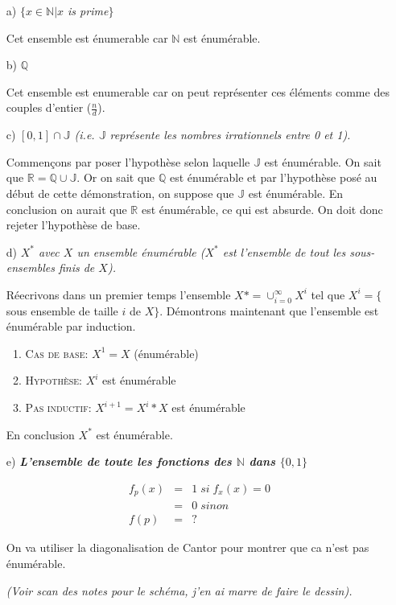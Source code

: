 \begin{itemize}
\item[a)]\textit{$\{x \in \mathbb{N}|x$ is prime$\}$}

Cet ensemble est énumerable car $\mathbb{N}$ est énumérable.

\item[b)]\textit{$\mathbb{Q}$}

Cet ensemble est enumerable car on peut représenter ces éléments comme des couples d'entier ($\frac{n}{d}$).

\item[c)]\textit{$[0,1] \cap \mathbb{J}$ (i.e. $\mathbb{J}$ représente les nombres irrationnels entre 0 et 1).}

Commençons par poser l'hypothèse selon laquelle $\mathbb{J}$ est énumérable. On sait que $\mathbb{R} = \mathbb{Q} \cup \mathbb{J}$. Or on sait que $\mathbb{Q}$ est énumérable et par l'hypothèse posé au début de cette démonstration, on suppose que $\mathbb{J}$ est énumérable. En conclusion on aurait que $\mathbb{R}$ est énumérable, ce qui est absurde. On doit donc rejeter l'hypothèse de base.

\item[d)]\textit{$X^*$ avec $X$ un ensemble énumérable ($X^*$ est l'ensemble de tout les sous-ensembles finis de $X$).}

Réecrivons dans un premier temps l'ensemble $X*=\cup^{\infty}_{i=0}X^i$ tel que $X^i = \{$sous ensemble de taille $i$ de $X\}$. Démontrons maintenant que l'ensemble est énumérable par induction.
\begin{enumerate}
	\item \textsc{Cas de base:} $X^1 = X$ (énumérable)
	\item \textsc{Hypothèse:} $X^i$ est énumérable
	\item \textsc{Pas inductif:} $X^{i+1} = X^i*X$ est énumérable
\end{enumerate}
En conclusion $X^*$ est énumérable.

\item[e)]\textit{\textbf{L'ensemble de toute les fonctions des $\mathbb{N}$ dans $\{0,1\}$}}

\begin{eqnarray*}
	f_p(x) &=& 1 \; si \; f_x(x)=0\\
	&=& 0 \; sinon \\
	f(p) &=& ?
\end{eqnarray*}

On va utiliser la diagonalisation de Cantor pour montrer que ca n'est pas énumérable.

\textit{(Voir scan des notes pour le schéma, j'en ai marre de faire le dessin).}

\end{itemize}

